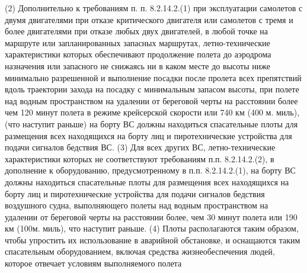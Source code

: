 (2) Дополнительно к требованиям п. п. 8.2.14.2.(1) при эксплуатации самолетов с двумя двигателями при отказе критического двигателя или самолетов с тремя и более двигателями при отказе любых двух двигателей, в любой точке на маршруте или запланированных запасных маршрутах, летно-технические характеристики которых обеспечивают продолжение полета до аэродрома назначения или запасного не снижаясь ни в каком месте до высоты ниже минимально разрешенной и выполнение посадки после пролета всех препятствий вдоль траектории захода на посадку с минимальным запасом высоты, при полете над водным пространством на удалении от береговой черты на расстоянии более чем 120 минут полета в режиме крейсерской скорости или 740 км (400 м. миль), (что наступит раньше) на борту ВС должны находиться спасательные плоты для размещения всех находящихся на борту лиц и пиротехнические устройства для подачи сигналов бедствия ВС. 
(3) Для всех других ВС, летно-технические характеристики которых не соответствуют требованиям п.п. 8.2.14.2.(2), в дополнение к оборудованию, предусмотренному в п.п. 8.2.14.2.(1), на борту ВС должны находиться спасательные плоты для размещения всех находящихся на борту лиц и пиротехнические устройства для подачи сигналов бедствия воздушного судна, выполняющего полеты над водным пространством на удалении от береговой черты на расстоянии более, чем 30 минут полета или 190 км (100м. миль), что наступит раньше.
(4) Плоты располагаются таким образом, чтобы упростить их использование в аварийной обстановке, и оснащаются таким спасательным оборудованием, включая средства жизнеобеспечения людей, которое отвечает условиям выполняемого полета
